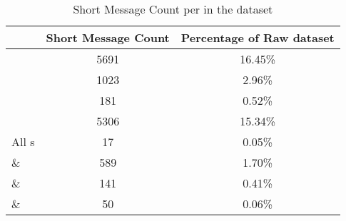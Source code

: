 
\begin{table}%
    \centering
    \begin{tabular}{|lcc|}
    \hline
    \textbf{\contentType{}} & \textbf{Short Message Count} & \textbf{Percentage of Raw dataset} \\ \hline
    \trafilaturaTitle{} & 5691 & 16.45\% \\
    \trafilaturaAbstract{} & 1023 & 2.96\% \\
    \trafilaturaFulltext{} & 181 & 0.52\% \\
    \translationTitle{} & 5306 & 15.34\% \\ \hline
    All \contentType{}s & 17 & 0.05\% \\
    \trafilaturaTitle{} $\&$ \trafilaturaAbstract{}  & 589   & 1.70\% \\
    \trafilaturaTitle{} $\&$ \trafilaturaFulltext{} & 141 & 0.41\% \\
    \trafilaturaFulltext{} $\&$ \trafilaturaAbstract{}  & 50   & 0.06\% \\
    \hline
    \end{tabular}
    \caption{Short Message Count per \contentType{} in the \VSI{} dataset}
    \label{tab:05_vsi_short_document_count}
\end{table}